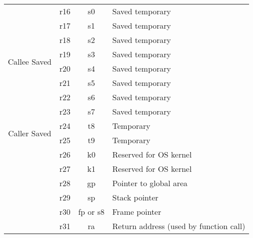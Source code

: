 \documentclass{report}
\begin{document}
\begin{center}
\begin{tabular}{c c c l}
		\hline
		\multirow{8}{*}{Callee Saved}  & r16 & s0       & Saved temporary                                     \\
		                               & r17 & s1       & Saved temporary                                     \\
		                               & r18 & s2       & Saved temporary                                     \\
		                               & r19 & s3       & Saved temporary                                     \\
		                               & r20 & s4       & Saved temporary                                     \\
		                               & r21 & s5       & Saved temporary                                     \\
		                               & r22 & s6       & Saved temporary                                     \\
		                               & r23 & s7       & Saved temporary                                     \\
		\hline
		\multirow{2}{*}{Caller Saved}  & r24 & t8       & Temporary                                           \\
		                               & r25 & t9       & Temporary                                           \\
		\hline
		                               & r26 & k0       & Reserved for OS kernel                              \\
		                               & r27 & k1       & Reserved for OS kernel                              \\
		                               & r28 & gp       & Pointer to global area                              \\
		                               & r29 & sp       & Stack pointer                                       \\
		                               & r30 & fp or s8 & Frame pointer                                       \\
		                               & r31 & ra       & Return address (used by function call)              \\
	\end{tabular}
\end{center}
\end{document}
